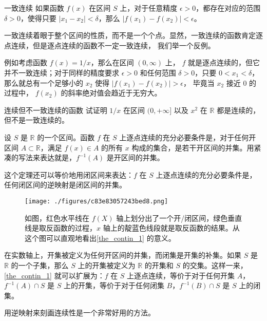 \begin{definition}{一致连续}
如果函数 $f(x)$ 在区间 $S$ 上，对于任意精度 $\epsilon>0$，都存在对应的范围 $\delta>0$，使得只要 $|x_1-x_2|<\delta$，那么 $|f(x_1)-f(x_2)|<\epsilon$。

\end{definition}

一致连续着眼于整个区间的性质，而不是一个个点。显然，一致连续的函数肯定逐点连续，但是逐点连续的函数不一定一致连续， 我们举一个反例。

\begin{example}{}
例如考虑函数 $f(x)=1/x$，那么在区间 $(0, \infty)$ 上， $f$ 就是逐点连续的，但它并不一致连续；对于同样的精度要求 $\epsilon>0$ 和任何范围 $\delta>0$，只要 $0<x_1<\delta$，那么就总有一个足够小的 $x_2$ 使得 $|f(x_1)-f(x_2)|>\epsilon$， 毕竟当 $x_2$ 接近 $0$ 的过程中， $f(x_2)$ 的斜率绝对值会趋近于无穷大。
\end{example}

\begin{exercise}{连续但不一致连续的函数}
试证明 $1/x$ 在区间 $(0, +\infty]$ 以及 $x^2$ 在 $\mathbb R$ 都是连续的， 但不是一致连续的。
\end{exercise}

\begin{theorem}{}\label{the_contin_1}
设 $S$ 是 $\mathbb{R}$ 的一个区间。函数 $f$ 在 $S$ 上逐点连续的充分必要条件是，对于任何开区间 $A\subset \mathbb{R}$，满足 $f(x)\in A$ 的所有 $x$ 构成的集合，是若干开区间的并集。用紧凑的写法来表达就是，$f^{-1}(A)$ 是开区间的并集。
\end{theorem}

这个定理还可以等价地用闭区间来表达：$f$ 在 $S$ 上逐点连续的充分必要条件是，任何闭区间的逆映射是闭区间的并集。

\begin{figure}[ht]
\centering
\texttt{[image: ./figures/c83e83057243bed8.png]}
\caption{如图，红色水平线在 $f(X)$ 轴上划分出了一个开/闭区间，绿色垂直线是取反函数的过程，$x$ 轴上的靛蓝色线段就是取反函数的结果。从这个图可以直观地看出\autoref{the_contin_1} 的意义。} \label{fig_contin_1}
\end{figure}

在实数轴上，开集被定义为任何开区间的并集，而闭集是开集的补集。如果 $S$ 是 $\mathbb{R}$ 的一个子集，那么 $S$ 上的开集被定义为 $\mathbb{R}$ 的开集和 $S$ 的交集。这样一来，\autoref{the_contin_1} 就可以扩展为：$f$ 在 $S$ 上逐点连续，等价于对于任何开集 $A$，$f^{-1}(A)\cap S$ 是 $S$ 上的开集，等价于对于任何闭集 $B$，$f^{-1}(B)\cap S$ 是 $S$ 上的闭集。

用逆映射来刻画连续性是一个非常好用的方法。
